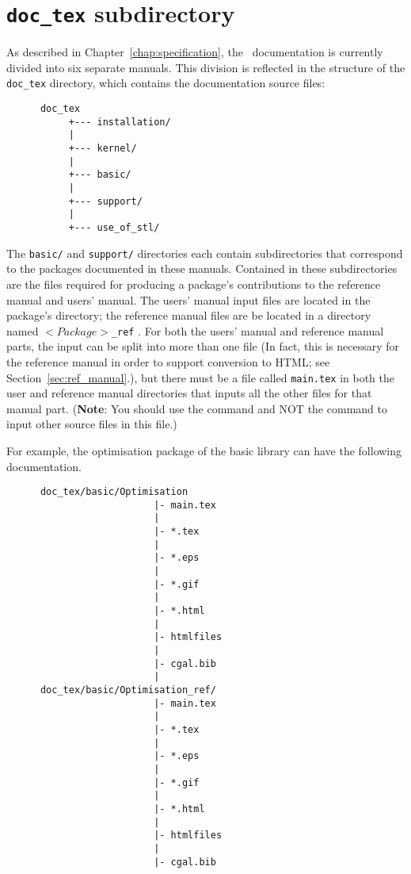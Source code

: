 \section{{\tt doc\_tex} subdirectory}
\label{sec:doc_tex_subdirectory}

As described in Chapter~\ref{chap:specification}, the \cgal\ documentation is
currently divided into six separate manuals.  This division is reflected
in the structure of the {\tt doc\_tex} directory, which contains the 
documentation source files: 
\begin{verbatim}
      doc_tex
           +--- installation/
           |
           +--- kernel/
           |
           +--- basic/
           |
           +--- support/
           |
           +--- use_of_stl/
\end{verbatim}

The {\tt basic/} and {\tt support/} directories each contain subdirectories
that correspond to the packages documented in these manuals.  Contained in these
subdirectories are the files required for producing a package's contributions
to the reference manual and users' manual. The users' manual input files are
located in the package's directory; the reference manual files are
be located in a directory named $<Package>${\tt \_ref}
.  
For both the users' manual and reference manual parts, the input can be
split into more than one file (In fact, this is necessary for the reference
manual in order to support conversion to HTML; 
see Section~\ref{sec:ref_manual}.), but there must be a file called 
{\tt main.tex} in both the user and reference manual directories that inputs 
all the other files for that manual part.
({\bf Note}: You should use the \verb|| command and NOT the 
\verb|| command to input other source files in this file.)  

For example, the optimisation package of 
the basic library can have the following documentation. 
\begin{verbatim}
      doc_tex/basic/Optimisation
                          |- main.tex
                          |
                          |- *.tex
                          |
                          |- *.eps
                          |
                          |- *.gif
                          |
                          |- *.html
                          |
                          |- htmlfiles
                          |
                          |- cgal.bib
                          |
      doc_tex/basic/Optimisation_ref/
                          |- main.tex
                          |
                          |- *.tex
                          |
                          |- *.eps
                          |
                          |- *.gif
                          |
                          |- *.html
                          |
                          |- htmlfiles
                          |
                          |- cgal.bib
\end{verbatim}

